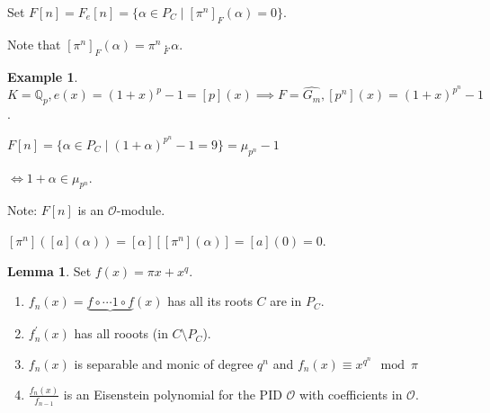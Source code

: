 \documentclass[openany]{amsbook}
\numberwithin{section}{chapter}
\theoremstyle{definition}
\newtheorem*{example}{Example}
\newtheorem{lemma}[theorem]{Lemma}
\begin{document}
Set \(F[n] = F_e[n] = \{ \alpha \in P_C \mid [\pi^n]_F (\alpha) = 0 \}\).

Note that \([\pi^n]_F(\alpha) = \pi^n \underset{F}{\cdot} \alpha\).

\begin{example}
    \(K = \mathbb{Q}_p, e(x) = (1+x)^p - 1 = [p](x) \implies F = \widehat{G_m}, [p^n](x) = (1+x)^{p^n} - 1\).
    
    \(F[n] = \{ \alpha \in P_C \mid (1+\alpha)^{p^n} - 1 = 9 \} = \mu_{p^n}-1\)
    
    \(\iff 1+\alpha \in \mu_{p^n}\).

    Note: \(F[n]\) is an \(\mathcal{O}\)-module.


    \([\pi^n]([a](\alpha)) = [\alpha][[\pi^{n}](\alpha )]=[a](0) = 0\). 

\end{example}

\begin{lemma}
    Set \(f(x)=\pi x + x^q\).

    \begin{enumerate}[label=\roman*)]
        \item \(f_n(x) = \underbrace{f \circ \cdots 1 \circ f} (x)\) has all its roots \(C\) are in \(P_C\).
        \item  \(f_n^{\prime} (x)\) has all rooots (in \(C \setminus P_C\)).
        \item \(f_n(x)\) is separable and monic of degree \(q^n\) and \(f_n(x) \equiv x^{q^n}\mod\pi\) 
        \item \(\frac{f_n(x)}{f_{n-1} }\) is an Eisenstein polynomial for the PID \(\mathcal{O}\) with coefficients in \(\mathcal{O}\).   
    \end{enumerate} 
\end{lemma}
\end{document}
